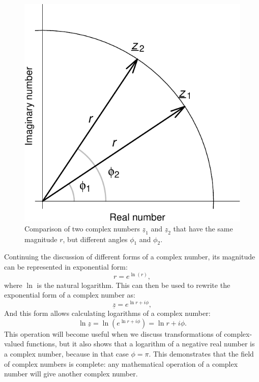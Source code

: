 \documentclass[
]{book}
\begin{document}
\begin{figure}
\centering
\includegraphics{Svetunkov---Svetunkov---Complex-Dynamic-Models_files/figure-latex/complexPlaneCircle-1.pdf}
\caption{\label{fig:complexPlaneCircle}Comparison of two complex numbers \(\underline{z}_1\) and \(\underline{z}_2\) that have the same magnitude \(r\), but different angles \(\phi_1\) and \(\phi_2\).}
\end{figure}

Continuing the discussion of different forms of a complex number, its magnitude can be represented in exponential form:
\begin{equation*}
    r = e^{\ln(r)},
\end{equation*}
where \(\ln\) is the natural logarithm. This can then be used to rewrite the exponential form of a complex number as:
\begin{equation}
    \underline{z} = e^{\ln r + i \phi} ,
    \label{eq:complexNumberExponentialAll}
\end{equation}
And this form allows calculating logarithms of a complex number:
\begin{equation}
    \ln \underline{z} = \ln \left(e^{\ln r + i \phi} \right) = \ln r + i \phi .
    \label{eq:complexNumberLogarithm}
\end{equation}
This operation will become useful when we discuss transformations of complex-valued functions, but it also shows that a logarithm of a negative real number is a complex number, because in that case \(\phi=\pi\). This demonstrates that the field of complex numbers is complete: any mathematical operation of a complex number will give another complex number.
\end{document}
